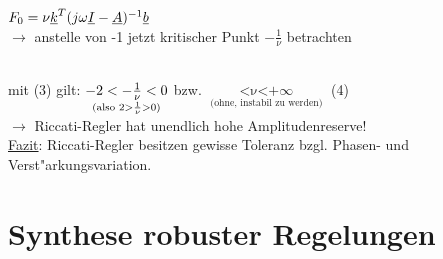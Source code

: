 \documentclass[openany,a4paper,11pt]{book}
\begin{document}
$F_0=\nu\uline{k}^T(j\omega\uline{I}-\uline{A})^{-1}\uline{b}$\\
$\rightarrow$ anstelle von -1 jetzt kritischer Punkt $-\frac{1}{\nu}$ betrachten\\
\\
mit (3) gilt: $\mathop{-2<-\frac{1}{\nu}<0}\limits_{\Large{(\text{also } 2>\frac{1}{\nu}>0)}}$ bzw. $\mathop{\frac{1}{2}<\nu<+\infty}\limits_{\text{(ohne, instabil zu werden)}}$ \quad (4) \\
$\rightarrow$ Riccati-Regler hat unendlich hohe Amplitudenreserve!\\
\uline{Fazit}: Riccati-Regler besitzen gewisse Toleranz bzgl. Phasen- und Verst"arkungsvariation.

\chapter{Synthese robuster Regelungen}
\end{document}
